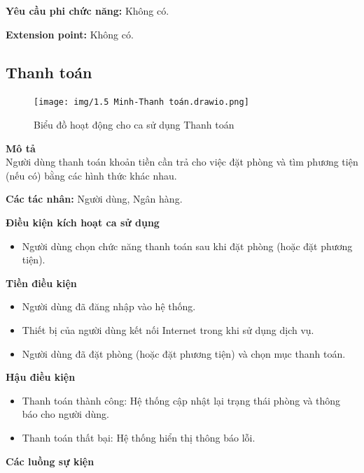 \textbf{Yêu cầu phi chức năng:} Không có.

\textbf{Extension point:} Không có.

\subsection{Thanh toán}
\begin{figure}[H]
    \centering
    \texttt{[image: img/1.5 Minh-Thanh toán.drawio.png]}
    \caption{Biểu đồ hoạt động cho ca sử dụng Thanh toán}
\end{figure}
\textbf{\indent Mô tả}\\
\indent Người dùng thanh toán khoản tiền cần trả cho việc đặt phòng và tìm phương tiện (nếu có) bằng các hình thức khác nhau.

\textbf{Các tác nhân:} Người dùng, Ngân hàng.

\textbf{Điều kiện kích hoạt ca sử dụng}
\begin{itemize}
    \item Người dùng chọn chức năng thanh toán sau khi đặt phòng (hoặc đặt phương tiện).
\end{itemize}

\textbf{Tiền điều kiện}
\begin{itemize}
    \item Người dùng đã đăng nhập vào hệ thống.
    \item Thiết bị của người dùng kết nối Internet trong khi sử dụng dịch vụ.
    \item Người dùng đã đặt phòng (hoặc đặt phương tiện) và chọn mục thanh toán.
\end{itemize}

\textbf{Hậu điều kiện}
\begin{itemize}
    \item Thanh toán thành công: Hệ thống cập nhật lại trạng thái phòng và thông báo cho người dùng.
    \item Thanh toán thất bại: Hệ thống hiển thị thông báo lỗi.
\end{itemize}

\textbf{Các luồng sự kiện}

